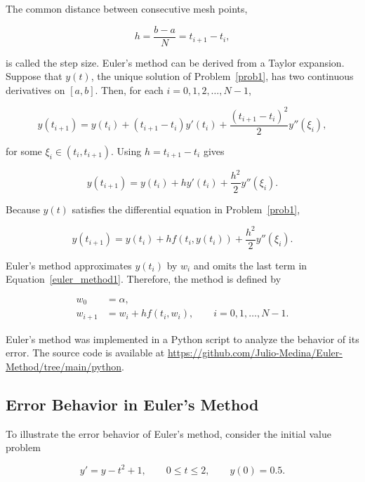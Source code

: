 \documentclass[a4paper]{article}
\begin{document}
The common distance between consecutive mesh points,

\begin{equation*}
h=\frac{b-a}{N}=t_{i+1}-t_i,
\end{equation*}

is called the step size. Euler's method can be derived from a Taylor expansion. Suppose that $y(t)$, the unique solution of Problem~\ref{prob1}, has two continuous derivatives on $[a,b]$. Then, for each $i=0,1,2,\ldots,N-1$,

\begin{equation*}
y(t_{i+1})=y(t_i)+(t_{i+1}-t_i)y'(t_i)+\frac{(t_{i+1}-t_i)^2}{2}y''(\xi_i),
\end{equation*}

for some $\xi_i\in(t_i,t_{i+1})$. Using $h=t_{i+1}-t_i$ gives

\begin{equation*}
y(t_{i+1})=y(t_i)+hy'(t_i)+\frac{h^2}{2}y''(\xi_i).
\end{equation*}

Because $y(t)$ satisfies the differential equation in Problem~\ref{prob1},

\begin{equation}\label{euler_method1}
y(t_{i+1})=y(t_i)+hf(t_i,y(t_i))+\frac{h^2}{2}y''(\xi_i).
\end{equation}

Euler's method approximates $y(t_i)$ by $w_i$ and omits the last term in Equation~\ref{euler_method1}. Therefore, the method is defined by

\begin{equation}
\begin{split}
w_0&=\alpha,\\
w_{i+1}&=w_i+hf(t_i,w_i), \qquad i=0,1,\ldots,N-1.
\end{split}
\end{equation}

Euler's method was implemented in a Python script to analyze the behavior of its error. The source code is available at \url{https://github.com/Julio-Medina/Euler-Method/tree/main/python}.

\subsection{Error Behavior in Euler's Method}

To illustrate the error behavior of Euler's method, consider the initial value problem

\begin{equation*}
y'=y-t^2+1, \qquad 0\leq t\leq 2, \qquad y(0)=0.5.
\end{equation*}
\end{document}

